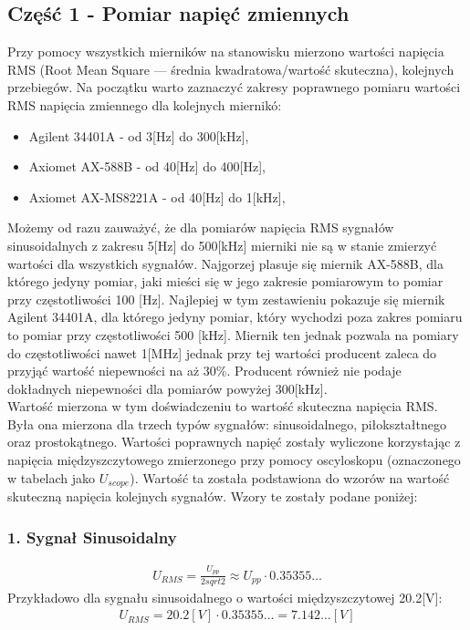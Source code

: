 \documentclass[11pt]{article}
\begin{document}
    \subsection*{Część 1 - Pomiar napięć zmiennych}
    Przy pomocy wszystkich mierników na stanowisku mierzono wartości napięcia RMS (Root Mean Square — średnia kwadratowa/wartość skuteczna),
    kolejnych przebiegów. Na początku warto zaznaczyć zakresy poprawnego pomiaru wartości RMS napięcia zmiennego dla kolejnych miernikó:
    \begin{itemize}
        \item Agilent 34401A - od 3[Hz] do 300[kHz],
        \item Axiomet AX-588B - od 40[Hz] do 400[Hz],
        \item Axiomet AX-MS8221A - od 40[Hz] do 1[kHz],
    \end{itemize}
    \par Możemy od razu zauważyć, że dla pomiarów napięcia RMS sygnałów sinusoidalnych z zakresu 5[Hz] do 500[kHz] mierniki nie są w stanie zmierzyć wartości dla wszystkich sygnałów.
    Najgorzej plasuje się miernik AX-588B, dla którego jedyny pomiar, jaki mieści się w jego zakresie pomiarowym to pomiar przy częstotliwości 100 [Hz]. Najlepiej w tym zestawieniu
    pokazuje się miernik Agilent 34401A, dla którego jedyny pomiar, który wychodzi poza zakres pomiaru to pomiar przy częstotliwości 500 [kHz]. Miernik ten jednak pozwala na pomiary
    do częstotliwości nawet 1[MHz] jednak przy tej wartości producent zaleca do przyjąć wartość niepewności na aż 30\%. Producent również nie podaje dokładnych niepewności dla pomiarów
    powyżej 300[kHz].\\
    \indent Wartość mierzona w tym doświadczeniu to wartość skuteczna napięcia RMS. Była ona mierzona dla trzech typów sygnałów: sinusoidalnego, piłokształtnego oraz prostokątnego.
    Wartości poprawnych napięć zostały wyliczone korzystając z napięcia międzyszczytowego zmierzonego przy pomocy oscyloskopu (oznaczonego w tabelach jako $U_{scope}$). Wartość ta
    została podstawiona do wzorów na wartość skuteczną napięcia kolejnych sygnałów. Wzory te zostały podane poniżej:
    \subsubsection*{1. Sygnał Sinusoidalny}
    \begin{gather*}
        U_{RMS}=\frac{U_{pp}}{2sqrt{2}}\approx U_{pp}\cdot 0.35355\dots
    \end{gather*}
    Przykładowo dla sygnału sinusoidalnego o wartości międzyszczytowej 20.2[V]:
    \begin{gather*}
        U_{RMS}=20.2[V] \cdot 0.35355\dots=7.142\dots[V]
    \end{gather*}
\end{document}
